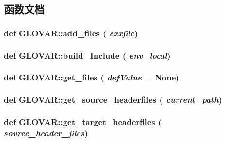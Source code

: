 \subsection{函数文档}
\hypertarget{namespaceGLOVAR_a066270fc23e62e60bd2ddc2850cd047a}{
\subsubsection[{add\_\-files}]{\setlength{\rightskip}{0pt plus 5cm}def GLOVAR::add\_\-files ( {\em cxxfile})}}
\label{namespaceGLOVAR_a066270fc23e62e60bd2ddc2850cd047a}
\hypertarget{namespaceGLOVAR_a7157866db6f95a7853123b722b81a31c}{
\subsubsection[{build\_\-Include}]{\setlength{\rightskip}{0pt plus 5cm}def GLOVAR::build\_\-Include ( {\em env\_\-local})}}
\label{namespaceGLOVAR_a7157866db6f95a7853123b722b81a31c}
\hypertarget{namespaceGLOVAR_ac0851f09b0d8bd8b4ff01d6c9ac7a9df}{
\subsubsection[{get\_\-files}]{\setlength{\rightskip}{0pt plus 5cm}def GLOVAR::get\_\-files ( {\em defValue} = {\ttfamily None})}}
\label{namespaceGLOVAR_ac0851f09b0d8bd8b4ff01d6c9ac7a9df}
\hypertarget{namespaceGLOVAR_a98ab3f054bd426b67fb92bb8943d8d59}{
\subsubsection[{get\_\-source\_\-headerfiles}]{\setlength{\rightskip}{0pt plus 5cm}def GLOVAR::get\_\-source\_\-headerfiles ( {\em current\_\-path})}}
\label{namespaceGLOVAR_a98ab3f054bd426b67fb92bb8943d8d59}
\hypertarget{namespaceGLOVAR_ac120cd73f9bb2ff537b62451a4c0dba1}{
\subsubsection[{get\_\-target\_\-headerfiles}]{\setlength{\rightskip}{0pt plus 5cm}def GLOVAR::get\_\-target\_\-headerfiles ( {\em source\_\-header\_\-files})}}
